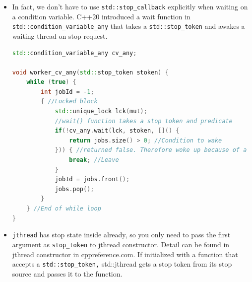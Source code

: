 \documentclass[a4paper,11pt,twoside]{book}
\begin{document}
\begin{itemize}
\begin{lstlisting}[frame=single, language=c++]
std::queue<int> jobs;
std::mutex mut;
std::condition_variable cv;

void worker(std::stop_token stoken) {
	std::stop_callback cb(stoken, []() { //Register a stop callback  
		cv.notify_all(); //Wake thread on stop request
	});
	
	while (true) {
		int jobId = -1;
		{ //Aquire a jobId in lock
			std::unique_lock lck(mut);
			cv.wait(lck, [stoken]() {
				return jobs.size() > 0 || stoken.stop_requested();
			});
			
			if (stoken.stop_requested()) { //Stop if requested to stop
				break;
			}
			jobId = jobs.front(); //There is jobId. Grab it.
			jobs.pop();
		} //End of locked block
	} //End of while loop
}

void manager() {
	std::stop_source ssource; //Create a stop source
	
	std::thread worker1(worker, ssource.get_token());
	std::thread worker2(worker, ssource.get_token());
	for (int i = 0; i < 5; i++) {
		{ //Locked block
			std::unique_lock lck(mut);
			jobs.push(i);
			cv.notify_one(); //Wakes up only one worker
		}
		std::this_thread::sleep_for(1s);
	}
	
	ssource.request_stop();
	worker1.join();
	worker2.join();
}	
\end{lstlisting}


	\item In fact, we don't have to use \texttt{std::stop\_callback} explicitly when waiting on a condition variable. C++20 introduced a wait function in \texttt{std::condition\_variable\_any} that takes a \texttt{std::stop\_token} and awakes a waiting thread on stop request. 
\begin{lstlisting}[frame=single, language=c++]	
std::condition_variable_any cv_any;

void worker_cv_any(std::stop_token stoken) {
	while (true) {
		int jobId = -1;	
		{ //Locked block
			std::unique_lock lck(mut);
			//wait() function takes a stop token and predicate
			if(!cv_any.wait(lck, stoken, []() {
				return jobs.size() > 0; //Condition to wake
			})) { //returned false. Therefore woke up because of a stop request. 
				break; //Leave
			}
			jobId = jobs.front();
			jobs.pop();
		}
	} //End of while loop
}	
\end{lstlisting}

\item \texttt{jthread} has stop state inside already, so you only need to pass the first argument as \texttt{stop\_token} to jthread constructor.  Detail can be found in jthread constructor in cppreference.com.  If initialized with a function that accepts a \texttt{std::stop\_token,} std::jthread gets a stop token from its stop source and passes it to the function.


\end{itemize}
\end{document}
